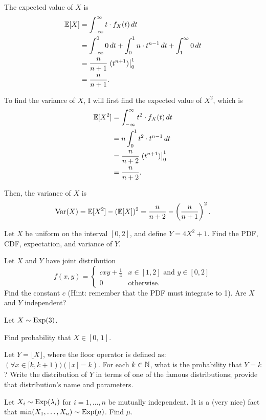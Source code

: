 \documentclass[11pt]{article}
\begin{document}
\begin{solution}
\begin{Parts}
\Part The expected value of $X$ is
\[
    \begin{split}
        \operatorname{\mathbb{E}}[X] &= \int_{-\infty}^{\infty} t \cdot f_X(t) \, dt \\
        &= \int_{-\infty}^{0} 0 \, dt + \int_{0}^{1} n \cdot t^{n-1} \, dt + \int_{1}^{\infty} 0 \, dt \\
        &= \frac{n}{n+1} \left. (t^{n+1}) \right|_0^1 \\
        &= \frac{n}{n+1}.
    \end{split}
\]

\Part To find the variance of $X$, I will first find the expected value of 
$X^2$, which is
\[
    \begin{split}
        \operatorname{\mathbb{E}}[X^2] &= \int_{-\infty}^{\infty} t^2 \cdot f_X(t) \, dt \\
        &= n \int_{0}^{1} t^2 \cdot t^{n-1}  \, dt \\
        &= \frac{n}{n+2} \left. (t^{n+1}) \right|_0^1 \\
        &= \frac{n}{n+2}.
    \end{split}
\]

Then, the variance of $X$ is
\[
    \operatorname{Var}(X) = \operatorname{\mathbb{E}}[X^2] - (\operatorname{\mathbb{E}}[X])^2 = \frac{n}{n+2} - \left( \frac{n}{n+1} \right)^2.
\]

\end{Parts}

\end{solution}


\begin{Parts}
    \Part Let $X$ be uniform on the interval $[0,2]$, and define $Y = 4X^2 + 1$. Find the PDF, CDF, expectation, and variance of $Y$.

    \Part Let $X$ and $Y$ have joint distribution 
    \[
        f(x,y) = \begin{cases}
            c x y + \frac{1}{4} & \text{$x \in [1,2]$ and $y \in [0,2]$} \\
            0 & \text{otherwise.}
        \end{cases}
    \]
    Find the constant $c$ (Hint: remember that the PDF must integrate to 1). Are $X$ and $Y$ independent?

    \Part Let $X \sim \operatorname{Exp}(3)$. 
    \begin{Parts}
    	\item Find probability that $X \in [0, \,1]$.
    	\item Let $Y = \lfloor X \rfloor$, where the floor operator is defined as:  $(\forall x \in [k, k+1))(\lfloor x \rfloor = k)$. For each $k \in \mathbb{N}$, what is the probability that $Y = k$? Write the distribution of $Y$ in terms of one of the famous distributions; provide that distribution's name and parameters.
    \end{Parts}

    \Part Let $X_i \sim \operatorname{Exp}(\lambda_i)$ for $i = 1,\ldots,n$ be mutually independent. It is a (very nice) fact that $\min(X_1,\ldots,X_n) \sim \operatorname{Exp}(\mu)$. Find $\mu$.
\end{Parts}
\end{document}
